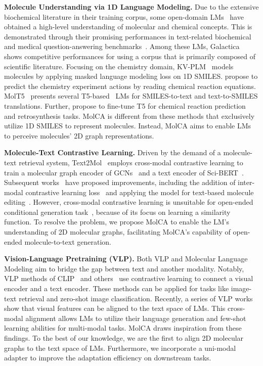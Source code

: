 \documentclass[11pt]{article}
\begin{document}
\textbf{Molecule Understanding via 1D Language Modeling.} Due to the extensive biochemical literature in their training corpus, some open-domain LMs~\cite{OPT,LLama,PALM} have obtained a high-level understanding of molecular and chemical concepts. This is demonstrated through their promising performances in text-related biochemical and medical question-answering benchmarks~\cite{MMLU, PubMedQA}. Among these LMs, Galactica~\cite{Galactica} shows competitive performances for using a corpus that is primarily composed of scientific literature. Focusing on the chemistry domain, KV-PLM~\citep{KVPLM} models molecules by applying masked language modeling loss on 1D SMILES. \citet{Smiles2actions} propose to predict the chemistry experiment actions by reading chemical reaction equations. MolT5~\citep{MolT5} presents several T5-based~\cite{T5} LMs for SMILES-to-text and text-to-SMILES translations. Further, \citet{TextChemT5} propose to fine-tune T5 for chemical reaction prediction and retrosynthesis tasks. MolCA is different from these methods that exclusively utilize 1D SMILES to represent molecules. Instead, MolCA aims to enable LMs to perceive molecules' 2D graph representations.


\textbf{Molecule-Text Contrastive Learning.} Driven by the demand of a molecule-text retrieval system, Text2Mol~\citep{Text2Mol} employs cross-modal contrastive learning to train a molecular graph encoder of GCNs~\cite{GCN} and a text encoder of Sci-BERT~\cite{SciBERT}. Subsequent works~\cite{MoMu, MoleculeSTM, CLAMP} have proposed improvements, including the addition of inter-modal contrastive learning loss~\citep{MoMu} and applying the model for text-based molecule editing~\citep{MoleculeSTM}. However, cross-modal contrastive learning is unsuitable for open-ended conditional generation task~\cite{Flamingo}, because of its focus on learning a similarity function. 
To resolve the problem, we propose MolCA to enable the LM's understanding of 2D molecular graphs, facilitating MolCA's capability of open-ended molecule-to-text generation.

\textbf{Vision-Language Pretraining (VLP).} Both VLP and Molecular Language Modeling aim to bridge the gap between text and another modality. Notably, VLP methods of CLIP~\cite{CLIP} and others~\cite{DeCLIP, FILIP} use contrastive learning to connect a visual encoder and a text encoder. These methods can be applied for tasks like image-text retrieval and zero-shot image classification. Recently, a series of VLP works~\cite{Frozen,LinearMapping, BLIP2, Flamingo} show that visual features can be aligned to the text space of LMs. This cross-modal alignment allows LMs to utilize their language generation and few-shot learning abilities for multi-modal tasks. MolCA draws inspiration from these findings. To the best of our knowledge, we are the first to align 2D molecular graphs to the text space of LMs. Furthermore, we incorporate a uni-modal adapter to improve the adaptation efficiency on downstream tasks.
\end{document}

